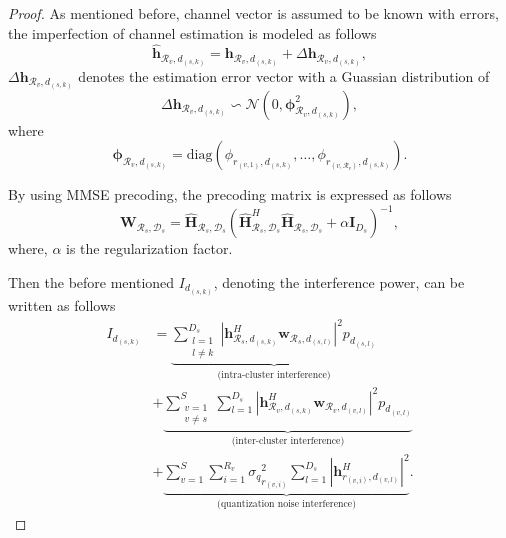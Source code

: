 \documentclass[conference,10pt,twocolumn,letter]{IEEEtran}
\begin{document}
\begin{proof}
As mentioned before, channel vector is assumed to be known with errors, the imperfection of channel estimation is modeled as follows
\begin{equation*}
\hat{\boldsymbol{h}}_{\mathcal{R}_v,d_{(s,k)}} = \boldsymbol{h}_{\mathcal{R}_v,d_{(s,k)}} + \Delta \boldsymbol{h}_{\mathcal{R}_v,d_{(s,k)}},
\end{equation*}
$\Delta \boldsymbol{h}_{\mathcal{R}_v,d_{(s,k)}}$ denotes the estimation error vector with a Guassian distribution of
$$\Delta \boldsymbol{h}_{\mathcal{R}_v,d_{(s,k)}}\backsim \mathcal{N}(0,\boldsymbol{\phi}_{\mathcal{R}_v,d_{(s,k)}}^2),$$
where 
$$\boldsymbol{\phi}_{\mathcal{R}_v,d_{(s,k)}} = \text{diag}(\phi_{r_{(v,1)},d_{(s,k)}},\ldots,\phi_{r_{(v,\mathcal{R}_v)},d_{(s,k)}}).$$


By using MMSE precoding, the precoding matrix is expressed as follows
\begin{equation}
\boldsymbol{W}_{\mathcal{R}_s,\mathcal{D}_s} = \hat{\boldsymbol{H}}_{\mathcal{R}_s,\mathcal{D}_s}(\hat{\boldsymbol{H}}_{\mathcal{R}_s,\mathcal{D}_s}^H \hat{\boldsymbol{H}}_{\mathcal{R}_s,\mathcal{D}_s}+ \alpha \boldsymbol{I}_{{D}_s})^{-1},
\end{equation} 
where, $\alpha$ is the regularization factor.


Then the before mentioned $I_{d_{(s,k)}}$, denoting the interference power, can be written as follows
\begin{equation}\label{6}
\begin{split}
I_{d_{(s,k)}} &=  \underbrace{\sum_{\substack{l=1 \\ l\neq k}}^{{D}_s} |\boldsymbol{h}_{\mathcal{R}_s, d_{(s,k)}}^H \boldsymbol{w}_{\mathcal{R}_{s},d_{(s,l)}}|^2  p_{d_{(s,l)}}}_{\text{(intra-cluster interference)}}\\
&+\underbrace{\sum_{\substack{v=1 \\ v\neq s}}^{S} \sum_{l=1}^{{D}_s} |\boldsymbol{h}_{\mathcal{R}_v, d_{(s,k)}}^H \boldsymbol{w}_{\mathcal{R}_{v},d_{(v,l)}}|^2 p_{d_{(v,l)}}}_{\text{(inter-cluster interference)}}\\
& +\underbrace{ \sum_{v=1}^{S} \sum_{i=1}^{{R}_v} {\sigma_q}_{r_{(v,i)}}^2 \sum_{l=1}^{{D}_s} |\boldsymbol{h}_{r_{(v,i)}, d_{(v,l)}}^H|^2 }_{\text{(quantization noise interference)}}.
\end{split}
\end{equation}

 \end{proof}
\end{document}
